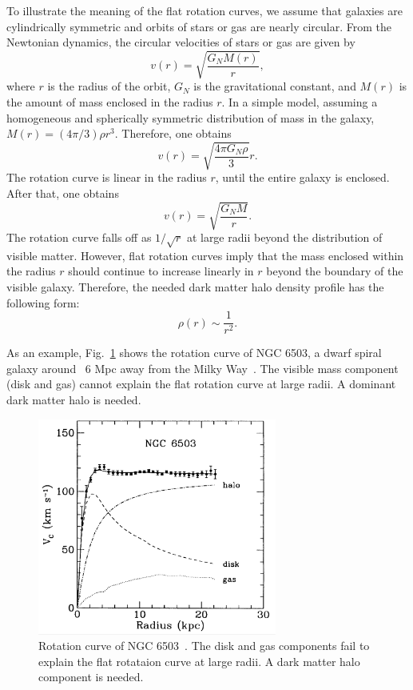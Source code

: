 \documentclass[doublespace,nopageskip]{VTthesis}
\begin{document}
{To illustrate the meaning of the flat rotation curves, we assume that galaxies are cylindrically symmetric and  orbits of stars or gas are nearly circular.} From the Newtonian dynamics, the circular velocities of stars or gas 
are given by
\begin{equation}
    v(r) = \sqrt{\frac{G_N M(r)}{r}},
\end{equation}
where $r$ is the radius of the orbit, $G_N$ is the gravitational constant, and $M(r)$ is the amount of mass enclosed in the radius $r$. In a simple model, assuming a homogeneous and spherically symmetric distribution of mass in the galaxy, $M(r) = (4\pi/3)\rho r^3$. Therefore, one obtains
\begin{equation}
    v(r) = \sqrt{\frac{4\pi G_N \rho}{3}}r.
\end{equation}
The rotation curve is linear in the radius $r$, until the entire galaxy is enclosed. After that, one obtains
\begin{equation}
    v(r) = \sqrt{\frac{G_N M}{r}}.
\end{equation}
The rotation curve falls off as $1/\sqrt{r}$ at large radii beyond the distribution of visible matter. However, flat rotation curves imply that the mass enclosed within the radius $r$ should continue to increase linearly in $r$
beyond the boundary of the visible galaxy.
Therefore, the needed dark matter halo density profile has the following form:
\begin{equation}
    \rho(r) \sim \frac{1}{r^2}.
\end{equation}

As an example, Fig.~\ref{fig:rotation_curves} shows the rotation curve of NGC 6503, {a dwarf spiral galaxy around ~6 Mpc away from the Milky Way}~\cite{1991MNRAS.249..523B}. The visible mass component (disk and gas) cannot explain the flat rotation curve at large radii. A dominant dark matter halo is needed.
\begin{figure}[htb]
    \centering
    \includegraphics[width=0.7\textwidth]{Figures/Intro/rotation_curves.eps}
    \caption{Rotation curve of NGC 6503~\cite{1991MNRAS.249..523B}. The disk and gas components fail to explain the flat rotataion curve at large radii. A dark matter halo component is needed.}
    \label{fig:rotation_curves}
\end{figure}
\end{document}
